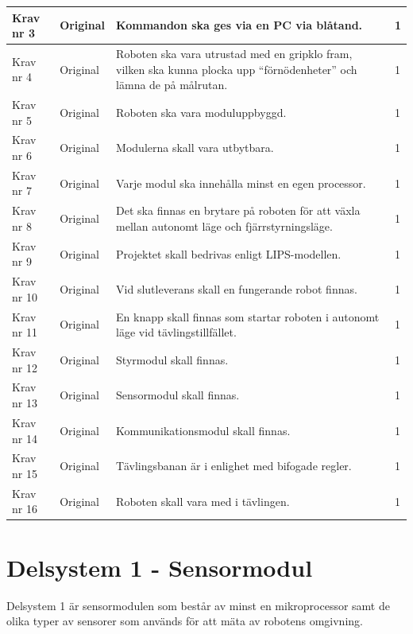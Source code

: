 \documentclass[11pt]{article}
\begin{document}
\begin{flushleft}
\begin{center}
\begin{longtable}{|l|l|p{.70\linewidth}|l|}
Krav nr 3 &
Original &
Kommandon ska ges via en PC via blåtand. &
1 \\ \hline

Krav nr 4 &
Original &
Roboten ska vara utrustad med en gripklo fram, vilken ska kunna plocka upp “förnödenheter” och lämna de på målrutan. &
1 \\ \hline

Krav nr 5 &
Original &
Roboten ska vara moduluppbyggd. &
1 \\ \hline

Krav nr 6 &
Original &
Modulerna skall vara utbytbara. &
1 \\ \hline

Krav nr 7 &
Original &
Varje modul ska innehålla minst en egen processor. &
1 \\ \hline

Krav nr 8 &
Original &
Det ska finnas en brytare på roboten för att växla mellan autonomt läge och fjärrstyrningsläge. &
1 \\ \hline

Krav nr 9 &
Original & 
Projektet skall bedrivas enligt LIPS-modellen.&
1 \\ \hline

Krav nr 10 &
Original &
Vid slutleverans skall en fungerande robot finnas. &
1 \\ \hline

Krav nr 11 &
Original &
En knapp skall finnas som startar roboten i autonomt läge vid tävlingstillfället. &
1 \\ \hline

Krav nr 12 &
Original &
Styrmodul skall finnas. &
1 \\ \hline

Krav nr 13 &
Original &
Sensormodul skall finnas. &
1 \\ \hline

Krav nr 14 &
Original &
Kommunikationsmodul skall finnas. &
1 \\ \hline

Krav nr 15 &
Original &
Tävlingsbanan är i enlighet med bifogade regler. &
1 \\ \hline

Krav nr 16 &
Original &
Roboten skall vara med i tävlingen. &
1 \\ \hline


\end{longtable}
\end{center}

\pagebreak

\section{Delsystem 1 - Sensormodul}
Delsystem 1 är sensormodulen som består av minst en mikroprocessor samt de olika typer av sensorer som används för att mäta av robotens omgivning.



\end{flushleft}
\end{document}
